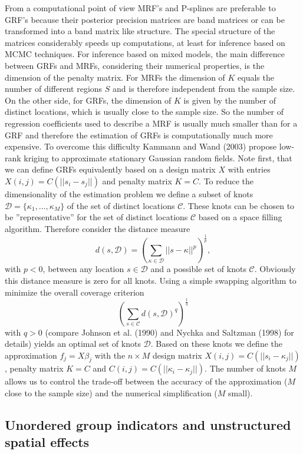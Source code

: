 From a computational point of view MRF's and P-splines are preferable to
GRF's because their posterior precision matrices are band matrices
or can be transformed into a band matrix like structure. The
special structure of the matrices considerably speeds up
computations, at least for inference based on MCMC techniques.
For inference based on mixed models, the main difference between GRFs and MRFs, considering their
numerical properties, is the dimension of the penalty matrix. For
MRFs the dimension of $K$ equals the number of different regions
$S$ and is therefore independent from the sample size. On the
other side, for GRFs, the dimension of $K$ is given by the number
of distinct locations, which is usually close to the sample size.
So the number of regression coefficients used to describe a MRF is
usually much smaller than for a GRF and therefore the estimation
of GRFs is computationally much more expensive. To overcome this
difficulty Kammann and Wand (2003) propose low-rank kriging to
approximate stationary Gaussian random fields. Note first, that we
can define GRFs equivalently based on a design matrix $X$ with
entries $X(i,j)=C(||s_i-s_j||)$ and penalty matrix $K=C$. To
reduce the dimensionality of the estimation problem we define a
subset of knots $\mathcal{D}=\{\kappa_1,\ldots,\kappa_M\}$ of the
set of distinct locations $\mathcal{C}$. These knots can be chosen
to be ''representative'' for the set of distinct locations
$\mathcal{C}$ based on a space filling algorithm. Therefore
consider the distance measure
\[d(s,\mathcal{D})=\left(\sum_{\kappa\in\mathcal{D}}||s-\kappa||^p\right)^{\frac{1}{p}},\]
with $p<0$, between any location $s\in\mathcal{D}$ and a possible
set of knots $\mathcal{C}$. Obviously this distance measure is
zero for all knots. Using a simple swapping algorithm to minimize
the overall coverage criterion
\[\left(\sum_{s\in\mathcal{C}}d(s,\mathcal{D})^q\right)^{\frac{1}{q}}\]
with $q>0$ (compare Johnson et al. (1990) and
Nychka and Saltzman (1998) for details) yields an optimal set of knots
$\mathcal{D}$. Based on these knots we define the approximation
$f_{j}=X\beta_j$ with the $n\times M$ design matrix
$X(i,j)=C(||s_i-\kappa_j||)$, penalty matrix $K=C$ and
$C(i,j)=C(||\kappa_i-\kappa_j||)$. The number of knots $M$ allows
us to control the trade-off between the accuracy of the
approximation ($M$ close to the sample size) and the numerical
simplification ($M$ small).

\subsection{Unordered group indicators and unstructured spatial effects}
\label{random}

